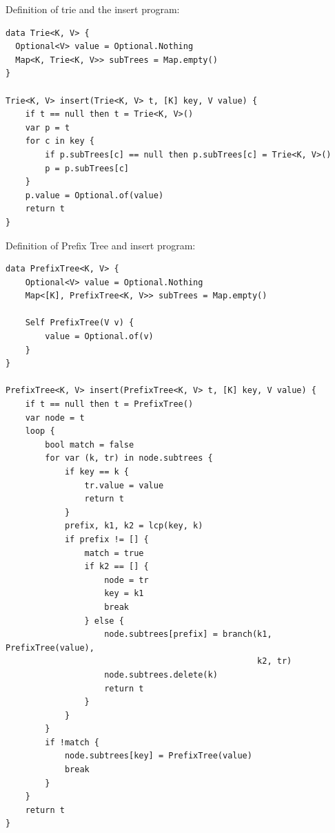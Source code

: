 \documentclass[b5paper]{article}
\begin{document}

Definition of trie and the insert program:

\begin{lstlisting}[language = Bourbaki]
data Trie<K, V> {
  Optional<V> value = Optional.Nothing
  Map<K, Trie<K, V>> subTrees = Map.empty()
}

Trie<K, V> insert(Trie<K, V> t, [K] key, V value) {
    if t == null then t = Trie<K, V>()
    var p = t
    for c in key {
        if p.subTrees[c] == null then p.subTrees[c] = Trie<K, V>()
        p = p.subTrees[c]
    }
    p.value = Optional.of(value)
    return t
}
\end{lstlisting}

Definition of Prefix Tree and insert program:

\begin{lstlisting}[language = Bourbaki]
data PrefixTree<K, V> {
    Optional<V> value = Optional.Nothing
    Map<[K], PrefixTree<K, V>> subTrees = Map.empty()

    Self PrefixTree(V v) {
        value = Optional.of(v)
    }
}

PrefixTree<K, V> insert(PrefixTree<K, V> t, [K] key, V value) {
    if t == null then t = PrefixTree()
    var node = t
    loop {
        bool match = false
        for var (k, tr) in node.subtrees {
            if key == k {
                tr.value = value
                return t
            }
            prefix, k1, k2 = lcp(key, k)
            if prefix != [] {
                match = true
                if k2 == [] {
                    node = tr
                    key = k1
                    break
                } else {
                    node.subtrees[prefix] = branch(k1, PrefixTree(value),
                                                   k2, tr)
                    node.subtrees.delete(k)
                    return t
                }
            }
        }
        if !match {
            node.subtrees[key] = PrefixTree(value)
            break
        }
    }
    return t
}
\end{lstlisting}
\end{document}
